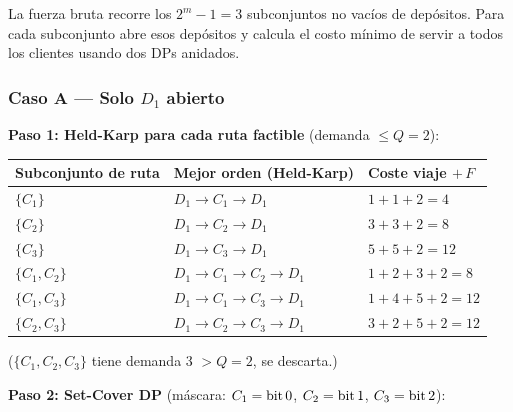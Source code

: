 \documentclass[12pt,a4paper]{article}
\begin{document}
La fuerza bruta recorre los $2^m - 1 = 3$ subconjuntos no vacíos de depósitos. Para cada subconjunto abre esos depósitos y calcula el costo mínimo de servir a todos los clientes usando dos DPs anidados.

\subsubsection*{Caso A — Solo $D_1$ abierto}

\textbf{Paso 1: Held-Karp para cada ruta factible} (demanda $\leq Q=2$):

\begin{center}
\begin{tabular}{lll}
\toprule
Subconjunto de ruta & Mejor orden (Held-Karp) & Coste viaje $+\,F$ \\
\midrule
$\{C_1\}$       & $D_1\!\to\!C_1\!\to\!D_1$              & $1+1+2=4$   \\
$\{C_2\}$       & $D_1\!\to\!C_2\!\to\!D_1$              & $3+3+2=8$   \\
$\{C_3\}$       & $D_1\!\to\!C_3\!\to\!D_1$              & $5+5+2=12$  \\
$\{C_1,C_2\}$   & $D_1\!\to\!C_1\!\to\!C_2\!\to\!D_1$   & $1+2+3+2=8$ \\
$\{C_1,C_3\}$   & $D_1\!\to\!C_1\!\to\!C_3\!\to\!D_1$   & $1+4+5+2=12$\\
$\{C_2,C_3\}$   & $D_1\!\to\!C_2\!\to\!C_3\!\to\!D_1$   & $3+2+5+2=12$\\
\bottomrule
\end{tabular}
\end{center}

($\{C_1,C_2,C_3\}$ tiene demanda 3 $> Q=2$, se descarta.)

\textbf{Paso 2: Set-Cover DP} (máscara: $C_1=\text{bit\,0}$, $C_2=\text{bit\,1}$, $C_3=\text{bit\,2}$):
\end{document}
